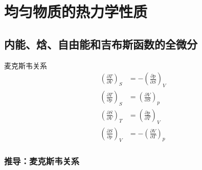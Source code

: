 \section{均匀物质的热力学性质}
\subsection{内能、焓、自由能和吉布斯函数的全微分}










麦克斯韦关系
\begin{equation}
    \begin{aligned}
        \left( \frac{\partial T}{\partial V} \right) _S&=-\left( \frac{\partial p}{\partial S} \right) _V
\\
\left( \frac{\partial T}{\partial p} \right) _S&=\left( \frac{\partial V}{\partial S} \right) _p
\\
\left( \frac{\partial S}{\partial V} \right) _T&=\left( \frac{\partial p}{\partial T} \right) _V
\\
\left( \frac{\partial S}{\partial p} \right) _V&=-\left( \frac{\partial V}{\partial T} \right) _p
    \end{aligned}
\end{equation}




\subsubsection{推导：麦克斯韦关系}


